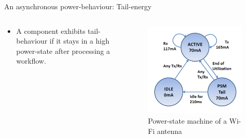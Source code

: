 %
\begin{frame}{An asynchronous power-behaviour: Tail-energy}
\begin{columns}
\begin{column}{0.5\textwidth}
\begin{definition}
\begin{itemize}
\item A component exhibits \alert{tail-behaviour} if it stays in a high power-state \alert{after} processing a workflow.
\end{itemize}
\end{definition}
\end{column}

\begin{column}{0.5\textwidth}
\begin{figure}
	\centering
	\includegraphics[width=\textwidth]{figures/wifi_statemachine.png} 
	\caption{Power-state machine of a Wi-Fi antenna  \cite{Ding:2013:CMI:2465529.2466586}}
\end{figure}
\end{column}
\end{columns}
\end{frame}
